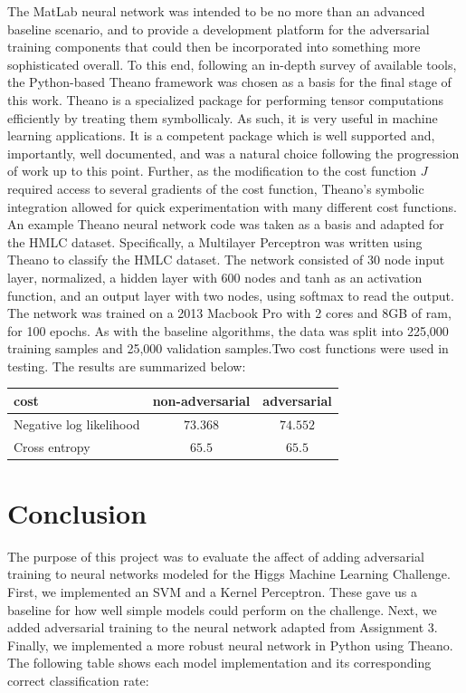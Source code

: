 \documentclass          {article} %
\begin{document}
The MatLab neural network was intended to be no more than an advanced baseline scenario, and to provide a development platform for the adversarial training components that could then be incorporated into something more sophisticated overall. To this end, following an in-depth survey of available tools, the Python-based Theano framework was chosen as a basis for the final stage of this work. Theano is a specialized package for performing tensor computations efficiently by treating them symbollicaly. As such, it is very useful in machine learning applications. It is a competent package which is well supported and, importantly, well documented, and was a natural choice following the progression of work up to this point. Further, as the modification to the cost function $J$ required access to several gradients of the cost function, Theano's symbolic integration allowed for quick experimentation with many different cost functions. An example Theano neural network code was taken as a basis and adapted for the HMLC dataset. Specifically, a Multilayer Perceptron was written using Theano to classify the HMLC dataset. The network consisted of 30 node input layer, normalized, a hidden layer with 600 nodes and tanh as an activation function, and an output layer with two nodes, using softmax to read the output. The network was trained on a 2013 Macbook Pro with 2 cores and 8GB of ram, for 100 epochs. As with the baseline algorithms, the data was split into 225,000 training samples and 25,000 validation samples.Two cost functions were used in testing. The results are summarized below:
\begin{center}
	\begin{tabular}{|l|c|c|}
	  \hline
	  cost&non-adversarial&adversarial \\
	  \hline
	  Negative log likelihood&$73.368$&$74.552$\\
	  \hline
	  Cross entropy&$65.5$&$65.5$ \\
	  \hline
	\end{tabular}
\end{center}


\section                {Conclusion}
\label                  {sec:conclusion}

The purpose of this project was to evaluate the affect of adding adversarial training to neural networks modeled for the Higgs Machine Learning Challenge. First, we implemented an SVM and a Kernel Perceptron. These gave us a baseline for how well simple models could perform on the challenge. Next, we added adversarial training to the neural network adapted from Assignment 3. Finally, we implemented a more robust neural network in Python using Theano. The following table shows each model implementation and its corresponding correct classification rate:
\end{document}
